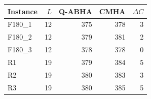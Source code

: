 \begin{tabular}{@{}lrrrr@{}}
\toprule
Instance & $L$ & Q-ABHA & CMHA & $\Delta C$ \\
\midrule
F180\_1 & 12 & 375 & 378 & 3 \\
F180\_2 & 12 & 379 & 381 & 2 \\
F180\_3 & 12 & 378 & 378 & 0 \\
R1 & 19 & 379 & 384 & 5 \\
R2 & 19 & 380 & 383 & 3 \\
R3 & 19 & 380 & 385 & 5 \\
\bottomrule
\end{tabular}

